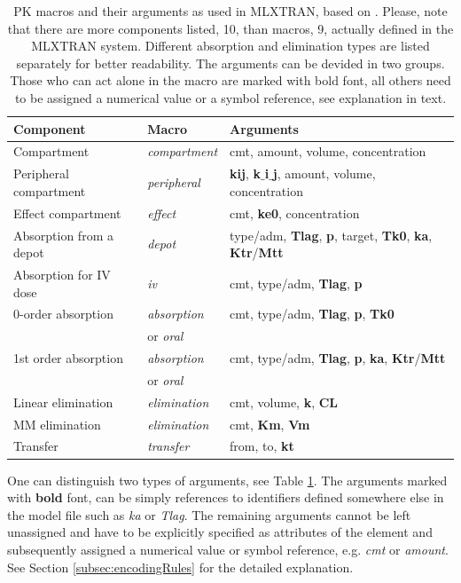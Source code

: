 \begin{table}[ht!]
\begin{center}
\begin{tabular}{lll}
  \hline
  \hline
Component & Macro & Arguments \\
  \hline
Compartment 			& \textit{compartment}	 	& cmt, amount, volume, concentration \\
Peripheral compartment	& \textit{peripheral}			& \textbf{kij}, \textbf{k$\_$i$\_$j}, amount, volume, concentration \\
Effect compartment 		& \textit{effect} 				& cmt, \textbf{ke0}, concentration \\
Absorption from a depot 	& \textit{depot} 				& type/adm, \textbf{Tlag}, \textbf{p}, target, \textbf{Tk0}, \textbf{ka}, \textbf{Ktr}/\textbf{Mtt} \\
Absorption for IV dose 	& \textit{iv} 				& cmt, type/adm, \textbf{Tlag}, \textbf{p} \\
0-order absorption 		& \textit{absorption}			& cmt, type/adm, \textbf{Tlag}, \textbf{p}, \textbf{Tk0} \\[-.5ex]
					& or \textit{oral}				& \\
1st order absorption 	& \textit{absorption}			& cmt, type/adm, \textbf{Tlag}, \textbf{p}, \textbf{ka}, \textbf{Ktr}/\textbf{Mtt} \\[-.5ex]
					& or \textit{oral}				& \\
Linear elimination 		& \textit{elimination}			& cmt, volume, \textbf{k}, \textbf{CL} \\
MM elimination 		& \textit{elimination}			& cmt, \textbf{Km}, \textbf{Vm} \\
Transfer 				& \textit{transfer}			& from, to, \textbf{kt} \\
  \hline
\end{tabular}
\caption{PK macros and their arguments as used in MLXTRAN, based on 
\cite{MLXTRANforMonolix:2014}. Please, note that there are more components listed, 
10, than macros, 9, actually defined in the MLXTRAN system. Different absorption 
and elimination types are listed separately for better readability. The arguments can be 
devided in two groups. Those who can act alone in the macro are marked with bold font,
all others need to be assigned a numerical value or a symbol reference, see explanation in text.}
\label{tab:MLXPLORElibrary}
\end{center}
\end{table}
One can distinguish two types of arguments, see Table \ref{tab:MLXPLORElibrary}. 
The arguments marked with \textbf{bold} font, can be simply references to identifiers 
defined somewhere else in the model file such as \emph{ka} or \emph{Tlag}. The remaining 
arguments cannot be left unassigned and have to be explicitly specified as attributes 
of the  element and subsequently assigned a numerical value or 
symbol reference, e.g. \emph{cmt} or \emph{amount}. See Section 
\ref{subsec:encodingRules} for the detailed explanation.

